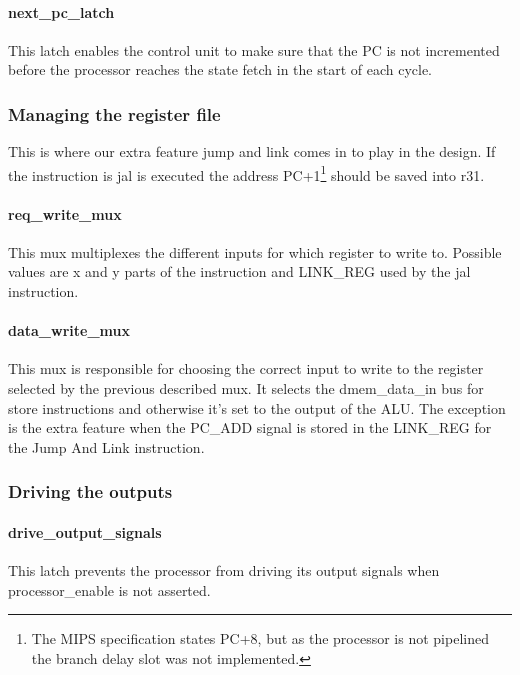 \paragraph{next\_pc\_latch} This latch enables the control unit to make sure that the PC is not incremented before the processor reaches the state fetch in the start of each cycle. 

\subsubsection{Managing the register file}

This is where our extra feature jump and link comes in to play in the design. If the instruction is jal is executed the address PC+1\footnote{The MIPS specification states PC+8, but as the processor is not pipelined the branch delay slot was not implemented.} should be saved into r31.

\paragraph{req\_write\_mux} This mux multiplexes the different inputs for which register to write to. Possible values are x and y parts of the instruction and LINK\_REG used by the jal instruction. 

\paragraph{data\_write\_mux} This mux is responsible for choosing the correct input to write to the register selected by the previous described mux. It selects the dmem\_data\_in bus for store instructions and otherwise it's set to the output of the ALU. The exception is the extra feature when the PC\_ADD signal is stored in the LINK\_REG for the Jump And Link instruction.

\subsubsection{Driving the outputs}

\paragraph{drive\_output\_signals} This latch prevents the processor from driving its output signals when processor\_enable is not asserted. 
